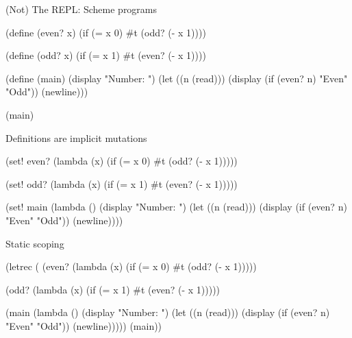 \begin{frame}[fragile]{(Not) The REPL: Scheme programs}
\begin{listingbox}\begin{schemecode}
(define (even? x)
  (if (= x 0)
    #t
    (odd? (- x 1))))

(define (odd? x)
  (if (= x 1)
    #t
    (even? (- x 1))))

(define (main)
  (display "Number: ")
  (let ((n (read)))
    (display (if (even? n) "Even" "Odd"))
    (newline)))

(main)
\end{schemecode}\end{listingbox}
\end{frame}

\begin{frame}[fragile]{Definitions are implicit mutations}
\begin{listingbox}\begin{schemecode}
(set! even?
  (lambda (x)
    (if (= x 0)
      #t
      (odd? (- x 1)))))

(set! odd?
  (lambda (x)
    (if (= x 1)
      #t
      (even? (- x 1)))))

(set! main
  (lambda ()
    (display "Number: ")
    (let ((n (read)))
      (display (if (even? n) "Even" "Odd"))
      (newline))))
\end{schemecode}\end{listingbox}
\end{frame}

\begin{frame}[fragile]{Static scoping}
\begin{listingbox}\begin{schemecode}
(letrec
  ( (even? (lambda (x)
             (if (= x 0)
               #t
               (odd? (- x 1)))))

    (odd? (lambda (x)
            (if (= x 1)
              #t
              (even? (- x 1)))))

    (main (lambda ()
            (display "Number: ")
            (let ((n (read)))
              (display (if (even? n) "Even" "Odd"))
              (newline)))))
  (main))
\end{schemecode}\end{listingbox}
\end{frame}

